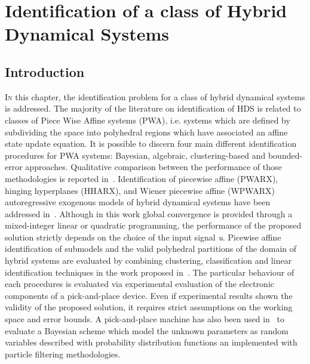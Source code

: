 
\chapter{Identification of a class of Hybrid Dynamical Systems}

\label{chap:identification}
\minitoc

\thispagestyle{empty}

\newpage
\section{Introduction}
\lettrine[lines=4]{\color{brickred}I}{n} this chapter, the identification problem for a class of hybrid dynamical systems is addressed.
The majority of the literature on identification of HDS is related to classes of Piece Wise Affine systems (PWA), i.e. systems which are defined by subdividing the  space into polyhedral regions which have associated an affine state update equation.
It is possible to discern four main different identification procedures for PWA systems: Bayesian, algebraic, clustering-based and bounded-error approaches. Qualitative comparison between the performance of those methodologies is reported in~\citep{Juloski,Paoletti}.
Identification of piecewise affine (PWARX), hinging hyperplanes (HHARX), and Wiener piecewise affine (WPWARX) autoregressive exogenous models of hybrid dynamical systems have been addressed in~\citep{Bemporad}. Although in this work global convergence is provided through a mixed-integer linear or quadratic programming, the performance of the proposed solution strictly depends on the choice of the input signal \textit{u}. 
Picewise affine identification of submodels and the valid polyhedral partitions of the domain of hybrid systems are evaluated by combining clustering, classification and linear identification techniques in the work proposed in~\citep{Ferrari}. 
The particular behaviour of each procedures is evaluated via experimental evaluation of the electronic components of a pick-and-place device. Even if experimental results shown the validity of the proposed solution, it requires strict assumptions on the working space and error bounds.
A pick-and-place machine has also been used in~\citep{juloski2005bayesian} to evaluate a Bayesian scheme which model the unknown parameters as random variables described with probability distribution functions an implemented with particle filtering methodologies. 

